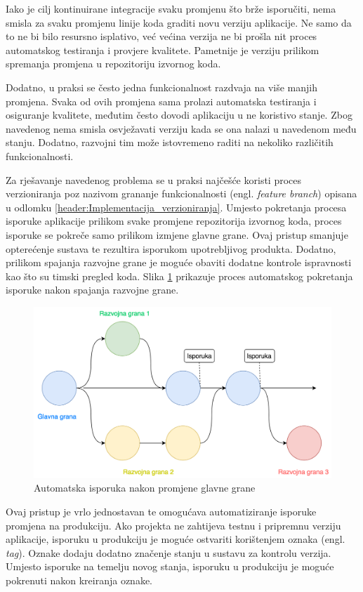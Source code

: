 \documentclass[times, utf8, diplomski, numeric]{fer}
\newcommand{\eng}[1]{(engl. \textit{#1})}
\begin{document}
Iako je cilj kontinuirane integracije svaku promjenu što brže isporučiti, nema smisla za svaku promjenu linije koda graditi novu verziju aplikacije. Ne samo da to ne bi bilo resursno isplativo, već većina verzija ne bi prošla nit proces automatskog testiranja i provjere kvalitete. Pametnije je verziju prilikom spremanja promjena u repozitoriju izvornog koda.

Dodatno, u praksi se često jedna funkcionalnost razdvaja na više manjih promjena. Svaka od ovih promjena sama prolazi automatska testiranja i osiguranje kvalitete, međutim često dovodi aplikaciju u ne koristivo stanje. Zbog navedenog nema smisla osvježavati verziju kada se ona nalazi u navedenom među stanju. Dodatno, razvojni tim može istovremeno raditi na nekoliko različitih funkcionalnosti.

Za rješavanje navedenog problema se u praksi najčešće koristi proces verzioniranja poz nazivom grananje funkcionalnosti \eng{feature branch} opisana u odlomku \ref{header:Implementacija_verzioniranja}. Umjesto pokretanja procesa isporuke aplikacije prilikom svake promjene repozitorija izvornog koda, proces isporuke se pokreče samo prilikom izmjene glavne grane. Ovaj pristup smanjuje opterećenje sustava te rezultira isporukom upotrebljivog produkta. Dodatno, prilikom spajanja razvojne grane je moguće obaviti dodatne kontrole ispravnosti kao što su timski pregled koda. Slika \ref{fig:FeatureBranchCD} prikazuje proces automatskog pokretanja isporuke nakon spajanja razvojne grane.

\begin{figure}
\centering
\includegraphics[scale=0.5]{FeatureBranchCD}
\caption{Automatska isporuka nakon promjene glavne grane}
\label{fig:FeatureBranchCD}
\end{figure}

Ovaj pristup je vrlo jednostavan te omogućava automatiziranje isporuke promjena na produkciju. Ako projekta ne zahtijeva testnu i pripremnu verziju aplikacije, isporuku u produkciju je moguće ostvariti korištenjem oznaka \eng{tag}. Oznake dodaju dodatno značenje stanju u sustavu za kontrolu verzija. Umjesto isporuke na temelju novog stanja, isporuku u produkciju je moguće pokrenuti nakon kreiranja oznake.
\end{document}
